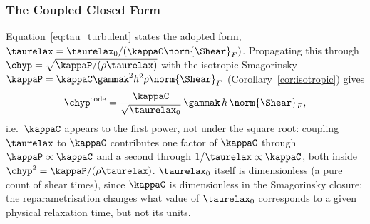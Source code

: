\subsubsection{The Coupled Closed Form}
Equation~\eqref{eq:tau_turbulent} states the adopted form,
$\taurelax=\taurelax_0/(\kappaC\norm{\Shear}_F)$. Propagating this through
$\chyp=\sqrt{\kappaP/(\rho\taurelax)}$ with the isotropic Smagorinsky
$\kappaP=\kappaC\gammak^2h^2\rho\norm{\Shear}_F$
(Corollary~\ref{cor:isotropic}) gives
\begin{equation}
  \label{eq:code_turbulent_new}
  \chyp^{\rm code} = \frac{\kappaC}{\sqrt{\taurelax_0}}\,\gammak\,h\,\norm{\Shear}_F ,
\end{equation}
i.e.\ $\kappaC$ appears to the first power, not under the square root:
coupling $\taurelax$ to $\kappaC$ contributes one factor of $\kappaC$
through $\kappaP\propto\kappaC$ and a second through
$1/\taurelax\propto\kappaC$, both inside $\chyp^2=\kappaP/(\rho\taurelax)$.
$\taurelax_0$ itself is dimensionless (a pure count of shear times),
since $\kappaC$ is dimensionless in the Smagorinsky closure; the
reparametrisation changes what value of $\taurelax_0$ corresponds to a
given physical relaxation time, but not its units.

